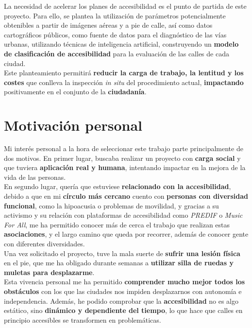 La necesidad de acelerar los planes de accesibilidad es el punto de partida de este proyecto. Para ello, se plantea la utilización de parámetros potencialmente obtenibles a partir de imágenes aéreas y a pie de calle, así como datos cartográficos públicos, como fuente de datos para el diagnóstico de las vías urbanas, utilizando técnicas de inteligencia artificial, construyendo un \textbf{modelo de clasificación de accesibilidad} para la evaluación de las calles de cada ciudad.
\\

Este planteamiento permitirá \textbf{reducir la carga de trabajo, la lentitud y los costes} que conlleva la inspección \textit{in situ} del procedimiento actual, \textbf{impactando} positivamente en el conjunto de la \textbf{ciudadanía}.
\\



\section{Motivación personal}
Mi interés personal a la hora de seleccionar este trabajo parte principalmente de dos motivos. En primer lugar, buscaba realizar un proyecto con\textbf{ carga social} y que tuviera \textbf{aplicación real y humana}, intentando impactar en la mejora de la vida de las personas.
\\

En segundo lugar, quería que estuviese \textbf{relacionado con la accesibilidad}, debido a que en mi \textbf{círculo más cercano} cuento con \textbf{personas con diversidad funcional}, como la hipoacusia o problemas de movilidad, y gracias a su activismo y su relación con plataformas de accesibilidad como \textit{PREDIF} o \textit{Music For All}, me ha permitido conocer más de cerca el trabajo que realizan estas \textbf{asociaciones}, y el largo camino que queda por recorrer, además de conocer gente con diferentes diversidades.
\\

Una vez solicitado el proyecto, tuve la mala suerte de \textbf{sufrir una lesión física} en el pie, que me ha obligado durante semanas a \textbf{utilizar silla de ruedas y muletas para desplazarme}.
\\

Esta vivencia personal me ha permitido \textbf{comprender mucho mejor todos los obstáculos} con los que las ciudades nos impiden desplazarnos con autonomía e independencia.
Además, he podido comprobar que la \textbf{accesibilidad} no es algo estático, sino \textbf{dinámico y dependiente del tiempo}, lo que hace que calles en principio accesibles se transformen en problemáticas.
\\

